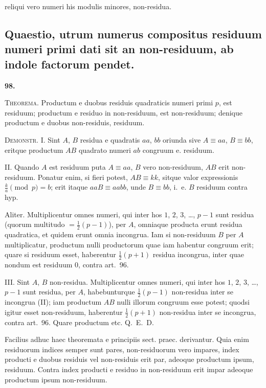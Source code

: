 \documentclass[12pt,a4paper]{article}
\theoremstyle{plain}
\theoremstyle{definition}
\theoremstyle{remark}
\begin{document}
reliqui vero numeri his modulis minores, non-residua.

\subsection*{Quaestio, utrum numerus compositus residuum numeri primi dati sit an non-residuum, ab indole factorum pendet.}

\setcounter{satz}{98}
\addtocounter{satz}{-1}
\textbf{98.}

\textsc{Theorema.} Productum e duobus residuis quadraticis numeri primi $p$, est residuum; productum e residuo in non-residuum, est non-residuum; denique productum e duobus non-residuis, residuum.

\textsc{Demonstr.} I. Sint $A$, $B$ residua e quadratis $aa$, $bb$ oriunda sive $A \equiv aa$, $B \equiv bb$, eritque productum $AB$ quadrato numeri $ab$ congruum e. residuum.

II. Quando $A$ est residuum puta $A \equiv aa$, $B$ vero non-residuum, $AB$ erit non-residuum. Ponatur enim, si fieri potest, $AB \equiv kk$, sitque valor expressionis $\frac{k}{a} \pmod{p} = b$; erit itaque $aaB \equiv aabb$, unde $B \equiv bb$, i.~e. $B$ residuum contra hyp.

Aliter. Multiplicentur omnes numeri, qui inter hos $1$, $2$, $3$, \ldots, $p-1$ sunt residua (quorum multitudo $=\frac{1}{2}(p-1)$), per $A$, omniaque producta erunt residua quadratica, et quidem erunt omnia incongrua. Iam si non-residuum $B$ per $A$ multiplicatur, productum nulli productorum quae iam habentur congruum erit; quare si residuum esset, haberentur $\frac{1}{2}(p+1)$ residua incongrua, inter quae nondum est residuum $0$, contra art.~96.

III. Sint $A$, $B$ non-residua. Multiplicentur omnes numeri, qui inter hos $1$, $2$, $3$, \ldots, $p-1$ sunt residua, per $A$, habebunturque $\frac{1}{2}(p-1)$ non-residua inter se incongrua (II); iam productum $AB$ nulli illorum congruum esse potest; quodsi igitur esset non-residuum, haberentur $\frac{1}{2}(p+1)$ non-residua inter se incongrua, contra art.~96. Quare productum etc. Q.~E.~D.

Facilius adhuc haec theoremata e principiis sect. praec. derivantur. Quia enim residuorum indices semper sunt pares, non-residuorum vero impares, index producti e duobus residuis vel non-residuis erit par, adeoque productum ipsum, residuum. Contra index producti e residuo in non-residuum erit impar adeoque productum ipsum non-residuum.
\end{document}
